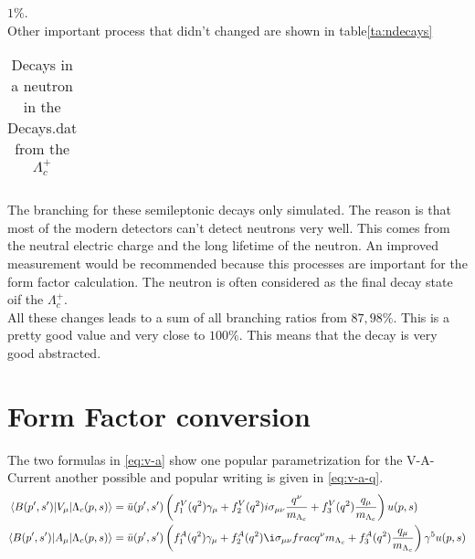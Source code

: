 \(1 \%\).\\
Other important process that didn't changed are shown in table{\eqref{ta:ndecays}}
\begin{longtable}{| c | c | c | c |}
  \caption{Decays in a neutron in the Decays.dat from the \(\Lambda_c^+\)}\label{ta:ndecays}\\ 
  \hline
  
\end{longtable}
The branching for these semileptonic decays only simulated. The reason is that 
most of the modern detectors can't detect neutrons very well. This comes from 
the neutral electric charge and the long lifetime of the neutron. An improved 
measurement would be recommended because this processes are important for 
the form factor calculation. The neutron is often considered as the final 
decay state oif the \(\Lambda_c^+\).\\
All these changes leads to a sum of all branching ratios from \(87,98\%\). 
This is a pretty good value and very close to \(100\%\). This means that 
the decay is very good abstracted.

\section{Form Factor conversion}
The two formulas in {\eqref{eq:v-a}} show one popular parametrization for 
the V-A-Current another possible and popular writing is given in 
{\eqref{eq:v-a-q}}.
\begin{align}
  \langle B(p', s') | V_\mu | \Lambda_c(p, s) \rangle & = \bar{u}(p', s') 
  \left( f^V_1(q^2) \gamma_\mu + f^V_2(q^2)i\sigma_{\mu\nu}\frac{q^\nu}{m_{\Lambda_c}} + 
  f^V_3(q^2)\frac{q_\mu}{m_{\Lambda_c}} \right) u(p, s) \nonumber \\
  \langle B(p', s') | A_\mu | \Lambda_c(p, s) \rangle & = \bar{u}(p', s') 
  \left( f^A_1(q^2) \gamma_\mu + f^A_2(q^2)\i\sigma_{\mu\nu}frac{q^\nu}{m_{\Lambda_c}} + 
  f^A_3(q^2)\frac{q_\mu}{m_{\Lambda_c}} \right) \gamma^5 u(p, s) \label{eq:v-a-q}
\end{align}

